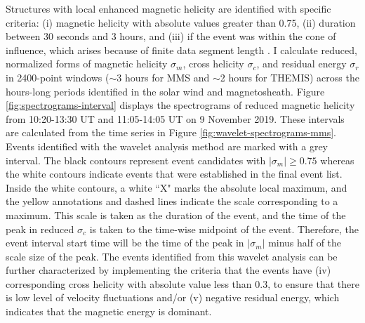 Structures with local enhanced magnetic helicity are identified with specific criteria: (i) magnetic helicity with absolute values greater than 0.75, (ii) duration between 30 seconds and 3 hours, and (iii) if the event was within the cone of influence, which arises because of finite data segment length \citep{Torrence:1998}. I calculate reduced, normalized forms of magnetic helicity $\sigma_m$, cross helicity $\sigma_c$, and residual energy $\sigma_r$ in 2400-point windows ($\sim$3 hours for MMS and $\sim$2 hours for THEMIS) across the hours-long periods identified in the solar wind and magnetosheath. Figure \ref{fig:spectrograms-interval} displays the spectrograms of reduced magnetic helicity from 10:20-13:30 UT and 11:05-14:05 UT on 9 November 2019. These intervals are calculated from the time series in Figure \ref{fig:wavelet-spectrograms-mms}. Events identified with the wavelet analysis method are marked with a grey interval. The black contours represent event candidates with $|\sigma_m|\geq 0.75$ whereas the white contours indicate events that were established in the final event list. Inside the white contours, a white ``X" marks the absolute local maximum, and the yellow annotations and dashed lines indicate the scale corresponding to a maximum. This scale is taken as the duration of the event, and the time of the peak in reduced $\sigma_c$ is taken to the time-wise midpoint of the event. Therefore, the event interval start time will be the time of the peak in $|\sigma_m|$ minus half of the scale size of the peak. The events identified from this wavelet analysis can be further characterized by implementing the criteria that the events have (iv) corresponding cross helicity with absolute value less than 0.3, to ensure that there is low level of velocity fluctuations and/or (v) negative residual energy, which indicates that the magnetic energy is dominant.
